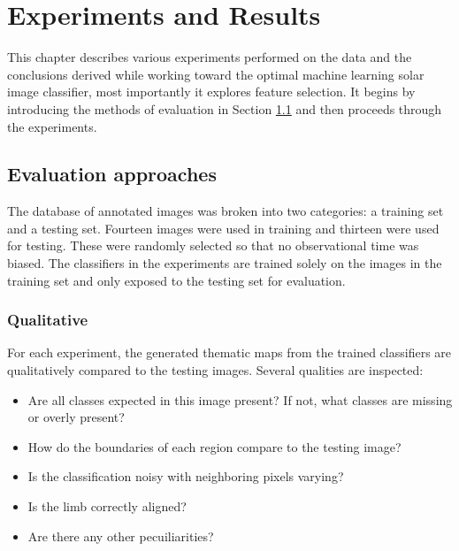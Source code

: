 \documentclass[twoside]{report}
\begin{document}
\chapter{Experiments and Results} \label{ch:experiments}

This chapter describes various experiments performed on the data and the conclusions derived while working toward the optimal machine learning solar image classifier, most importantly it explores feature selection. It begins by introducing the methods of evaluation in Section \ref{sec:evaluationmethods} and then proceeds through the experiments. 

\section{Evaluation approaches}\label{sec:evaluationmethods}
The database of annotated images was broken into two categories: a training set and a testing set. Fourteen images were used in training and thirteen were used for testing. These were randomly selected so that no observational time was biased. The classifiers in the experiments are trained solely on the images in the training set and only exposed to the testing set for evaluation. 

\subsection{Qualitative}
For each experiment, the generated thematic maps from the trained classifiers are qualitatively compared to the testing images. Several qualities are inspected:
\begin{itemize}
\item Are all classes expected in this image present? If not, what classes are missing or overly present?
\item How do the boundaries of each region compare to the testing image? 
\item Is the classification noisy with neighboring pixels varying? 
\item Is the limb correctly aligned? 
\item Are there any other pecuiliarities? 
\end{itemize}
\end{document}
